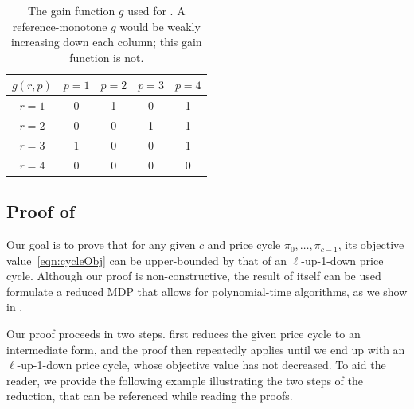 \documentclass[format=acmsmall, review=false]{acmart}
\newcommand{\luid}{$\ell$-up-1-down\xspace}
\begin{document}
\begin{table}[]
\centering
\begin{tabular}{c|cccc}
$g(r,p)$ & $p=1$ & $p=2$ & $p=3$ & $p=4$ \\
\hline
$r=1$ & 0 & 1 & 0 & 1 \\
$r=2$ & 0 & 0 & 1 & 1 \\
$r=3$ & 1 & 0 & 0 & 1 \\
$r=4$ & 0 & 0 & 0 & 0 \\
\end{tabular}
\caption{The gain function $g$ used for .  A reference-monotone $g$ would be weakly increasing down each column; this gain function is not.}
\label{tab:strangeEg}
\end{table}

\subsection{Proof of }

Our goal is to prove that for any given $c$ and price cycle $\pi_0,\ldots,\pi_{c-1}$, its objective value~\eqref{eqn:cycleObj} can be upper-bounded by that of an \luid price cycle.
Although our proof is non-constructive, the result of  itself can be used formulate a reduced MDP that allows for polynomial-time algorithms, as we show in .

Our proof proceeds in two steps.
 first reduces the given price cycle to an intermediate form, and the proof then repeatedly applies  until we end up with an \luid price cycle, whose objective value has not decreased.
To aid the reader, we provide the following example illustrating the two steps of the reduction, that can be referenced while reading the proofs.
\end{document}
